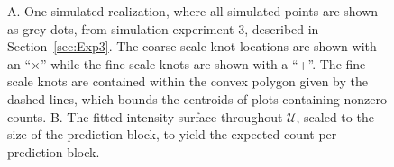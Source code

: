 \documentclass[12pt, titlepage]{article}\usepackage[]{graphicx}\usepackage[]{color}
\def\cU{\mathcal{U}}
\begin{document}
\begin{figure}[H]
\begin{center}
	\end{center}
  \caption{A. One simulated realization, where all simulated points are shown as grey dots, from simulation experiment 3, described in Section~\ref{sec:Exp3}.  The coarse-scale knot locations are shown with an ``$\times$'' while the fine-scale knots are shown with a ``+''. The fine-scale knots are contained within the convex polygon given by the dashed lines, which bounds the centroids of plots containing nonzero counts. B. The fitted intensity surface throughout $\cU$, scaled to the size of the prediction block, to yield the expected count per prediction block.  \label{fig:SimulationExample}}
	\end{figure}

\end{document}
